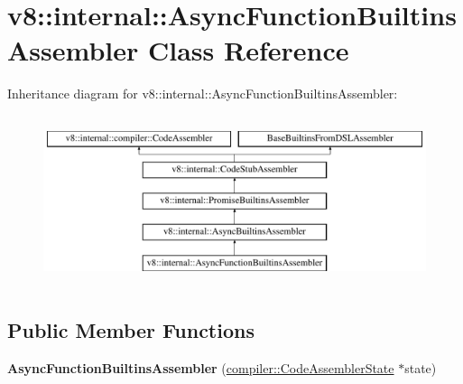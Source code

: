 \hypertarget{classv8_1_1internal_1_1AsyncFunctionBuiltinsAssembler}{}\section{v8\+:\+:internal\+:\+:Async\+Function\+Builtins\+Assembler Class Reference}
\label{classv8_1_1internal_1_1AsyncFunctionBuiltinsAssembler}
Inheritance diagram for v8\+:\+:internal\+:\+:Async\+Function\+Builtins\+Assembler\+:\begin{figure}[H]
\begin{center}
\leavevmode
\includegraphics[height=5.000000cm]{classv8_1_1internal_1_1AsyncFunctionBuiltinsAssembler}
\end{center}
\end{figure}
\subsection*{Public Member Functions}
\begin{DoxyCompactItemize}
\item 
\mbox{\label{classv8_1_1internal_1_1AsyncFunctionBuiltinsAssembler_a9870a60223aac0ee6d71b30f6875a005}} 
{\bfseries Async\+Function\+Builtins\+Assembler} (\mbox{\hyperlink{classv8_1_1internal_1_1compiler_1_1CodeAssemblerState}{compiler\+::\+Code\+Assembler\+State}} $\ast$state)
\end{DoxyCompactItemize}
